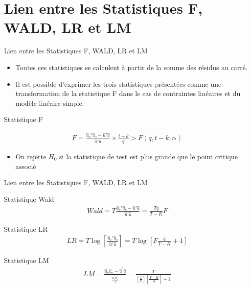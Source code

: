 \documentclass{beamer}
\begin{document}
\section{Lien entre les Statistiques F, WALD, LR et LM}

\frame{\tableofcontents[current]}

\begin{frame}{Lien entre les Statistiques F, WALD, LR et LM}
\begin{itemize}
\item Toutes ces statistiques se calculent à partir de la somme des résidus au carré.
\item Il est possible d’exprimer les trois statistiques présentées comme une transformation de la statistique F dans le cas de contraintes linéaires et du modèle linéaire simple.
\end{itemize}
\begin{block}{Statistique F}

\begin{align*}
F= \frac{\hat{u}_0'\hat{u}_0-\hat{u}'\hat{u}}{\hat{u}'\hat{u}} \times \frac{t-k}{q}>F(q,t-k;\alpha) 
\end{align*}
\begin{itemize}
\item On rejette $H_0$ si la statistique de test est plus grande que le point critique associé
\end{itemize}
\end{block}
\end{frame}

\begin{frame}{Lien entre les Statistiques F, WALD, LR et LM}
\begin{block}{Statistique Wald}
\begin{align*}
Wald=T \frac{\hat{u}_c'\hat{u}_c-\hat{u}'\hat{u}}{\hat{u}'\hat{u}} =\frac{Tq}{T-K}F
\end{align*}
\end{block}
\begin{block}{Statistique LR}
\begin{align*}
LR=T \log \left[ \frac{\hat{u}_c'\hat{u}_c}{\hat{u}'\hat{u}} \right]= T \log \left[F \frac{q}{T-K}+1 \right]
\end{align*}
\end{block}
\begin{block}{Statistique LM}
\begin{align*}
LM=\frac{\hat{u}_c^{'}\hat{u}_c-\hat{u}^{'}\hat{u}}{\frac{\hat{u}_c^{'}\hat{u}_c}{T}}=\frac{T}{\left[\frac{1}{F}\right] \left[\frac{T-K}{q}\right]+1}
\end{align*}
\end{block}

\end{frame}
\end{document}
